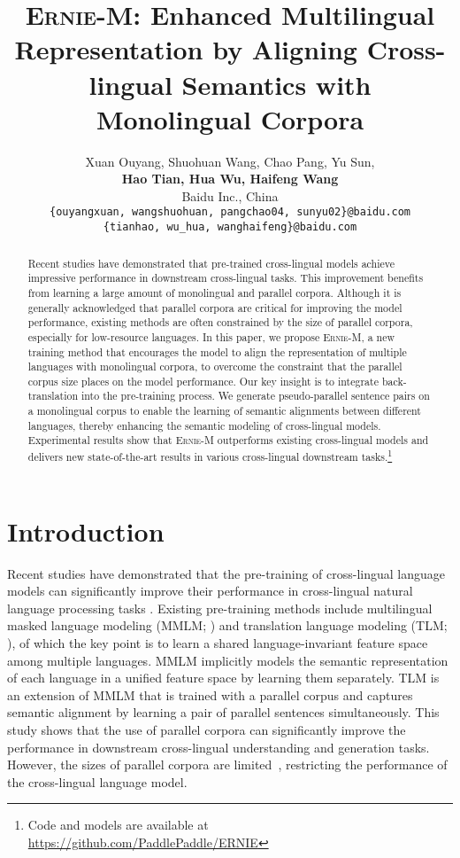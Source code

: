 \documentclass[11pt]{article}
\title{\textsc{Ernie-M}: Enhanced Multilingual Representation by Aligning Cross-lingual Semantics with Monolingual Corpora}
\author{Xuan Ouyang, Shuohuan Wang, Chao Pang, Yu Sun, \\
\textbf{Hao Tian, Hua Wu, Haifeng Wang} \\
  Baidu Inc., China \\
  {\tt \{ouyangxuan, wangshuohuan, pangchao04, sunyu02\}@baidu.com} \\
  {\tt \{tianhao, wu\_hua, wanghaifeng\}@baidu.com} \\}
\begin{document}
\maketitle
\begin{abstract}
Recent studies have demonstrated that pre-trained cross-lingual models achieve impressive performance in downstream cross-lingual tasks. This improvement benefits from learning a large amount of monolingual and parallel corpora. Although it is generally acknowledged that parallel corpora are critical for improving the model performance, existing methods are often constrained by the size of parallel corpora, especially for low-resource languages. In this paper, we propose \textsc{Ernie-M}, a new training method that encourages the model to align the representation of multiple languages with monolingual corpora, to overcome the constraint that the parallel corpus size places on the model performance. Our key insight is to integrate back-translation into the pre-training process. We generate pseudo-parallel sentence pairs on a monolingual corpus to enable the learning of semantic alignments between different languages, thereby enhancing the semantic modeling of cross-lingual models. Experimental results show that \textsc{Ernie-M} outperforms existing cross-lingual models and delivers new state-of-the-art results in various cross-lingual downstream tasks.\footnote{Code and models are available at \url{https://github.com/PaddlePaddle/ERNIE}}
\end{abstract}

\section{Introduction}
Recent studies have demonstrated that the pre-training of cross-lingual language models can significantly improve their performance in cross-lingual natural language processing tasks \cite{devlin2018bert,lample2019cross,conneau2019unsupervised,liu2020multilingual}. Existing pre-training methods include multilingual masked language modeling (MMLM; \citealt{devlin2018bert}) and translation language modeling (TLM; \citealt{lample2019cross}), of which the key point is to learn a shared language-invariant feature space among multiple languages. 
MMLM implicitly models the semantic representation of each language in a unified feature space by learning them separately.
TLM is an extension of MMLM that is trained with a parallel corpus and captures semantic alignment by learning a pair of parallel sentences simultaneously. This study shows that the use of parallel corpora can significantly improve the performance in downstream cross-lingual understanding and generation tasks. However, the sizes of parallel corpora are limited~\cite{tran2020cross}, restricting the performance of the cross-lingual language model.
\end{document}
